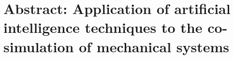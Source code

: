 
\section*{Abstract: Application of artificial intelligence techniques to the co-simulation of mechanical systems}

